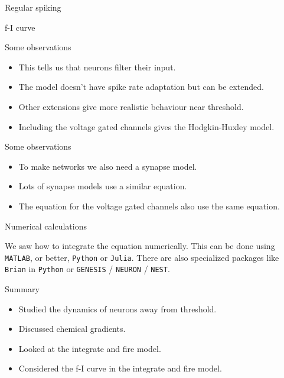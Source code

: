 \documentclass{beamer}
\newcommand{\cbla}{\color{black}}
\newcommand{\cblu}{\color{blue}}
\begin{document}
\begin{frame}{Regular spiking}
  \begin{center}
    
\end{center}
  \end{frame}

\begin{frame}{f-I curve}
  \begin{center}
    
\end{center}
  \end{frame}

\begin{frame}{Some observations}
  \begin{itemize}
  \item This tells us that neurons filter their input.
  \item The model doesn't have spike rate adaptation but can be extended.
  \item Other extensions give more realistic behaviour near threshold.
  \item Including the voltage gated channels gives the \cblu{}Hodgkin-Huxley\cbla{} model.
  \end{itemize}
\end{frame}


\begin{frame}{Some observations}
  \begin{itemize}
  \item To make networks we also need a synapse model.
  \item Lots of synapse models use a similar equation.
  \item The equation for the voltage gated channels also use the same equation.
  \end{itemize}
\end{frame}


\begin{frame}{Numerical calculations}

We saw how to integrate the equation numerically. This can be done
using \texttt{MATLAB}, or better, \texttt{Python} or \texttt{Julia}. There are also specialized
packages like \texttt{Brian} in \texttt{Python} or \texttt{GENESIS} / \texttt{NEURON} / \texttt{NEST}.
  
\end{frame}

\begin{frame}{Summary}
  \begin{itemize}
  \item Studied the dynamics of neurons away from threshold.
  \item Discussed chemical gradients.
  \item Looked at the integrate and fire model.
  \item Considered the f-I curve in the integrate and fire model.
  \end{itemize}
\end{frame}
\end{document}
